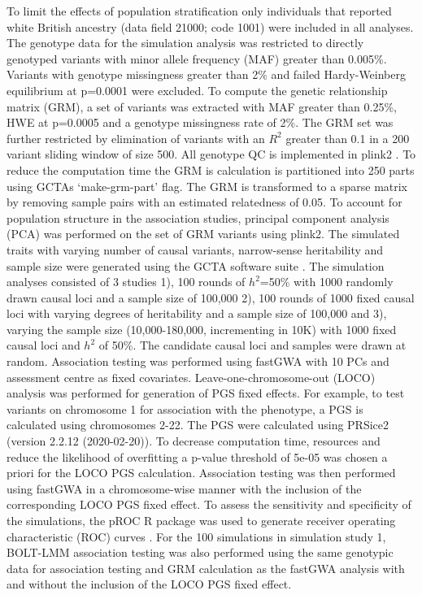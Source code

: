 \documentclass[doublespacing]{bmcart}
\begin{document}
To limit the effects of population stratification only individuals that reported white British ancestry (data field 21000; code 1001) were included in all analyses. The genotype data for the simulation analysis was restricted to directly genotyped variants with minor allele frequency (MAF) greater than 0.005\%. Variants with genotype missingness greater than 2\% and failed Hardy-Weinberg equilibrium at p=0.0001 were excluded. To compute the genetic relationship matrix (GRM), a set of variants was extracted with MAF greater than 0.25\%, HWE at p=0.0005 and a genotype missingness rate of 2\%. The GRM set was further restricted by elimination of variants with an $R^2$ greater than 0.1 in a 200 variant sliding window of size 500. All genotype QC is implemented in plink2 \cite{chang2015second}. To reduce the computation time the GRM is calculation is partitioned into 250 parts using GCTAs `make-grm-part' flag. The GRM is transformed to a sparse matrix by removing sample pairs with an estimated relatedness of 0.05. To account for population structure in the association studies, principal component analysis (PCA) was performed on the set of GRM variants using plink2. The simulated traits with varying number of causal variants, narrow-sense heritability and sample size were generated using the GCTA software suite \cite{yang2011gcta}. The simulation analyses consisted of 3 studies 1), 100 rounds of $h^2$=50\% with 1000 randomly drawn causal loci and a sample size of 100,000 2), 100 rounds of 1000 fixed causal loci with varying degrees of heritability and a sample size of 100,000 and 3), varying the sample size (10,000-180,000, incrementing in 10K) with 1000 fixed causal loci and $h^2$ of 50\%. The candidate causal loci and samples were drawn at random. Association testing was performed using fastGWA with 10 PCs and assessment centre as fixed covariates. Leave-one-chromosome-out (LOCO) analysis was performed for generation of PGS fixed effects. For example, to test variants on chromosome 1 for association with the phenotype, a PGS is calculated using chromosomes 2-22. The PGS were calculated using PRSice2 (version 2.2.12 (2020-02-20))\cite{choi2019prsice}. To decrease computation time, resources and reduce the likelihood of overfitting a p-value threshold of 5e-05 was chosen a priori for the LOCO PGS calculation. Association testing was then performed using fastGWA in a chromosome-wise manner with the inclusion of the corresponding LOCO PGS fixed effect. To assess the sensitivity and specificity of the simulations, the pROC R package was used to generate receiver operating characteristic (ROC) curves \cite{robin2011proc}. For the 100 simulations in simulation study 1, BOLT-LMM association testing was also performed using the same genotypic data for association testing and GRM calculation as the fastGWA analysis with and without the inclusion of the LOCO PGS fixed effect.    
\end{document}
